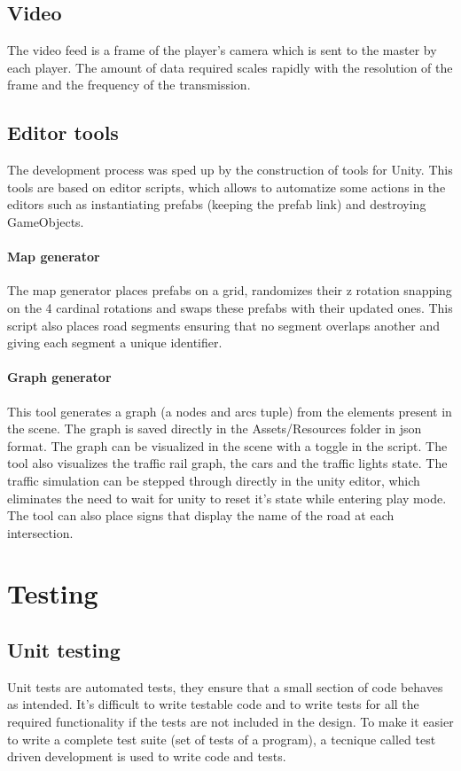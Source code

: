 \documentclass[12pt]{article}
\begin{document}
\subsection{Video}
The video feed is a frame of the player's camera which is sent to the master by each player. The amount of data required scales rapidly with the resolution of the frame and the frequency of the transmission.

\subsection{Editor tools}
The development process was sped up by the construction of tools for Unity. This tools are based on editor scripts, which allows to automatize some actions in the editors such as instantiating prefabs (keeping the prefab link) and destroying GameObjects.
\paragraph{Map generator}
The map generator places prefabs on a grid, randomizes their z rotation snapping on the 4 cardinal rotations and swaps these prefabs with their updated ones. This script also places road segments ensuring that no segment overlaps another and giving each segment a unique identifier.
\paragraph{Graph generator}
This tool generates a graph (a nodes and arcs tuple) from the elements present in the scene. The graph is saved directly in the Assets/Resources folder in json format. The graph can be visualized in the scene with a toggle in the script. The tool also visualizes the traffic rail graph, the cars and the traffic lights state. The traffic simulation can be stepped through directly in the unity editor, which eliminates the need to wait for unity to reset it's state while entering play mode. The tool can also place signs that display the name of the road at each intersection.

\clearpage

\section{Testing}
\subsection{Unit testing}
Unit tests are automated tests, they ensure that a small section of code behaves as intended. It's difficult to write testable code and to write tests for all the required functionality if the tests are not included in the design. To make it easier to write a complete test suite (set of tests of a program), a tecnique called test driven development is used to write code and tests.
\end{document}
